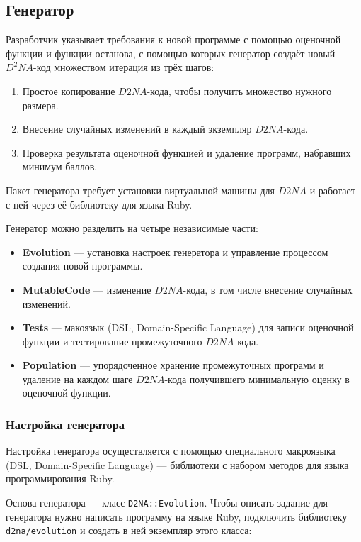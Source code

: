 \documentclass[utf8,a5paper,portrait,10pt]{eskdtext}
\begin{document}
\newpage
\subsection{Генератор}
Разработчик указывает требования к новой программе с помощью оценочной функции и
функции останова, с помощью которых генератор создаёт новый $D^2NA$-код
множеством итерация из трёх шагов:
\begin{enumerate}
  \item Простое копирование $D2NA$-кода, чтобы получить множество нужного
        размера.
  \item Внесение случайных изменений в каждый экземпляр $D2NA$-кода.
  \item Проверка результата оценочной функцией и удаление программ, набравших
        минимум баллов.
\end{enumerate}

Пакет генератора требует установки виртуальной машины для $D2NA$ и работает с
ней через её библиотеку для языка Ruby.

Генератор можно разделить на четыре независимые части:
\begin{itemize}
  \item \textbf{Evolution} — установка настроек генератора и управление
        процессом создания новой программы.
  \item \textbf{MutableCode} — изменение $D2NA$-кода, в том числе внесение
        случайных изменений.
  \item \textbf{Tests} — макоязык (DSL, Domain-Specific Language) для записи
        оценочной функции и тестирование промежуточного $D2NA$-кода.
  \item \textbf{Population} — упорядоченное хранение промежуточных программ и
        удаление на каждом шаге $D2NA$-кода получившего минимальную оценку в
        оценочной функции.
\end{itemize}

\subsubsection{Настройка генератора}
Настройка генератора осуществляется с помощью специального макроязыка
(DSL, Domain-Specific Language) — библиотеки с набором методов для языка
программирования Ruby.

Основа генератора — класс \texttt{D2NA::Evolution}. Чтобы описать задание для
генератора нужно написать программу на языке Ruby, подключить библиотеку
\texttt{d2na/evolution} и создать в ней экземпляр этого класса:
\end{document}
